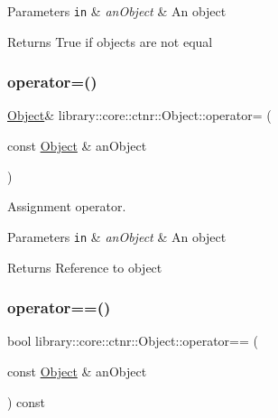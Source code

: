 \begin{DoxyParams}[1]{Parameters}
\mbox{\tt in}  & {\em an\+Object} & An object \\
\hline
\end{DoxyParams}
\begin{DoxyReturn}{Returns}
True if objects are not equal 
\end{DoxyReturn}
\mbox{\label{classlibrary_1_1core_1_1ctnr_1_1Object_acbc5a6b4e2971d1cb977867d086832fe}} 
\subsubsection{\texorpdfstring{operator=()}{operator=()}}
{\footnotesize\ttfamily \hyperlink{classlibrary_1_1core_1_1ctnr_1_1Object}{Object}\& library\+::core\+::ctnr\+::\+Object\+::operator= (\begin{DoxyParamCaption}\item[{const \hyperlink{classlibrary_1_1core_1_1ctnr_1_1Object}{Object} \&}]{an\+Object }\end{DoxyParamCaption})}



Assignment operator. 


\begin{DoxyParams}[1]{Parameters}
\mbox{\tt in}  & {\em an\+Object} & An object \\
\hline
\end{DoxyParams}
\begin{DoxyReturn}{Returns}
Reference to object 
\end{DoxyReturn}
\mbox{\label{classlibrary_1_1core_1_1ctnr_1_1Object_a543801cb9c7c22432603aca5435595e9}} 
\subsubsection{\texorpdfstring{operator==()}{operator==()}}
{\footnotesize\ttfamily bool library\+::core\+::ctnr\+::\+Object\+::operator== (\begin{DoxyParamCaption}\item[{const \hyperlink{classlibrary_1_1core_1_1ctnr_1_1Object}{Object} \&}]{an\+Object }\end{DoxyParamCaption}) const}



